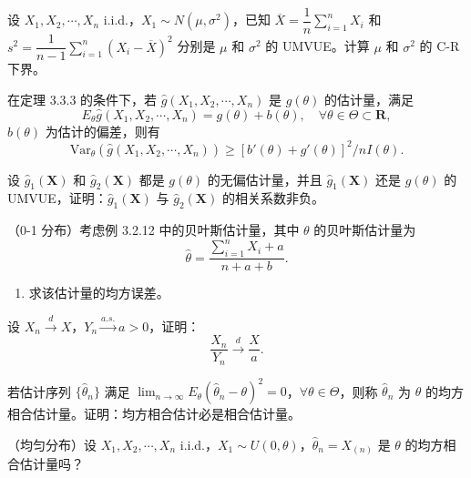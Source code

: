 \begin{homework}[12]
设 $X_1, X_2, \cdots, X_n$ i.i.d.，$X_1 \sim N(\mu, \sigma^2)$，已知 $\overline{X} = \dfrac{1}{n}\sum_{i=1}^{n} X_i$ 和 $s^2 = \dfrac{1}{n-1}\sum_{i=1}^{n}(X_i - \overline{X})^2$ 分别是 $\mu$ 和 $\sigma^2$ 的 UMVUE。计算 $\mu$ 和 $\sigma^2$ 的 C-R 下界。
\end{homework}

\begin{homework}[14]
在定理 3.3.3 的条件下，若 $\hat{g}(X_1, X_2, \cdots, X_n)$ 是 $g(\theta)$ 的估计量，满足
\[
E_\theta \hat{g}(X_1, X_2, \cdots, X_n) = g(\theta) + b(\theta), \quad \forall \theta \in \Theta \subset \mathbf{R},
\]
$b(\theta)$ 为估计的偏差，则有
\[
\mathrm{Var}_\theta(\hat{g}(X_1, X_2, \cdots, X_n)) \geq [b'(\theta) + g'(\theta)]^2 / nI(\theta).
\]
\end{homework}

\begin{homework}[15]
设 $\hat{g}_1(\boldsymbol{X})$ 和 $\hat{g}_2(\boldsymbol{X})$ 都是 $g(\theta)$ 的无偏估计量，并且 $\hat{g}_1(\boldsymbol{X})$ 还是 $g(\theta)$ 的 UMVUE，证明：$\hat{g}_1(\boldsymbol{X})$ 与 $\hat{g}_2(\boldsymbol{X})$ 的相关系数非负。
\end{homework}

\begin{homework}[16]
（0-1 分布）考虑例 3.2.12 中的贝叶斯估计量，其中 $\theta$ 的贝叶斯估计量为
$$
\hat{\theta} = \frac{\sum_{i=1}^n X_i + a}{n + a + b}.
$$
\begin{enumerate}[(1)]
    \item 求该估计量的均方误差。
\end{enumerate}
\end{homework}

\begin{homework}[1]
设 $X_n \xrightarrow{d} X$，$Y_n \xrightarrow{a.s.} a > 0$，证明：
\[
\frac{X_n}{Y_n} \xrightarrow{d} \frac{X}{a}.
\]
\end{homework}

\begin{homework}[1]
若估计序列 $\{\hat{\theta}_n\}$ 满足 $\lim_{n\to\infty} E_\theta(\hat{\theta}_n - \theta)^2 = 0$，$\forall \theta \in \Theta$，则称 $\hat{\theta}_n$ 为 $\theta$ 的均方相合估计量。证明：均方相合估计必是相合估计量。
\end{homework}

\begin{homework}[2]
（均匀分布）设 $X_1, X_2, \cdots, X_n$ i.i.d.，$X_1 \sim U(0, \theta)$，$\hat{\theta}_n = X_{(n)}$ 是 $\theta$ 的均方相合估计量吗？
\end{homework}

